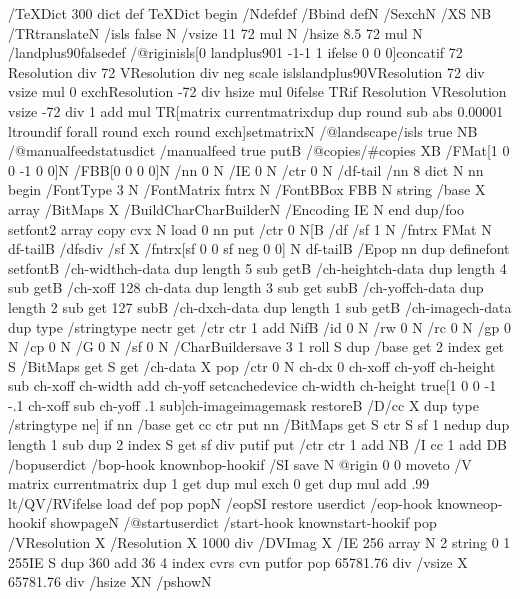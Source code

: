 /TeXDict 300 dict def TeXDict begin /N{def}def /B{bind def}N /S{exch}N
/X{S N}B /TR{translate}N /isls false N /vsize 11 72 mul N /hsize 8.5 72
mul N /landplus90{false}def /@rigin{isls{[0 landplus90{1 -1}{-1 1}
ifelse 0 0 0]concat}if 72 Resolution div 72 VResolution div neg scale
isls{landplus90{VResolution 72 div vsize mul 0 exch}{Resolution -72 div
hsize mul 0}ifelse TR}if Resolution VResolution vsize -72 div 1 add mul
TR[matrix currentmatrix{dup dup round sub abs 0.00001 lt{round}if}
forall round exch round exch]setmatrix}N /@landscape{/isls true N}B
/@manualfeed{statusdict /manualfeed true put}B /@copies{/#copies X}B
/FMat[1 0 0 -1 0 0]N /FBB[0 0 0 0]N /nn 0 N /IE 0 N /ctr 0 N /df-tail{
/nn 8 dict N nn begin /FontType 3 N /FontMatrix fntrx N /FontBBox FBB N
string /base X array /BitMaps X /BuildChar{CharBuilder}N /Encoding IE N
end dup{/foo setfont}2 array copy cvx N load 0 nn put /ctr 0 N[}B /df{
/sf 1 N /fntrx FMat N df-tail}B /dfs{div /sf X /fntrx[sf 0 0 sf neg 0 0]
N df-tail}B /E{pop nn dup definefont setfont}B /ch-width{ch-data dup
length 5 sub get}B /ch-height{ch-data dup length 4 sub get}B /ch-xoff{
128 ch-data dup length 3 sub get sub}B /ch-yoff{ch-data dup length 2 sub
get 127 sub}B /ch-dx{ch-data dup length 1 sub get}B /ch-image{ch-data
dup type /stringtype ne{ctr get /ctr ctr 1 add N}if}B /id 0 N /rw 0 N
/rc 0 N /gp 0 N /cp 0 N /G 0 N /sf 0 N /CharBuilder{save 3 1 roll S dup
/base get 2 index get S /BitMaps get S get /ch-data X pop /ctr 0 N ch-dx
0 ch-xoff ch-yoff ch-height sub ch-xoff ch-width add ch-yoff
setcachedevice ch-width ch-height true[1 0 0 -1 -.1 ch-xoff sub ch-yoff
.1 sub]{ch-image}imagemask restore}B /D{/cc X dup type /stringtype ne{]}
if nn /base get cc ctr put nn /BitMaps get S ctr S sf 1 ne{dup dup
length 1 sub dup 2 index S get sf div put}if put /ctr ctr 1 add N}B /I{
cc 1 add D}B /bop{userdict /bop-hook known{bop-hook}if /SI save N @rigin
0 0 moveto /V matrix currentmatrix dup 1 get dup mul exch 0 get dup mul
add .99 lt{/QV}{/RV}ifelse load def pop pop}N /eop{SI restore userdict
/eop-hook known{eop-hook}if showpage}N /@start{userdict /start-hook
known{start-hook}if pop /VResolution X /Resolution X 1000 div /DVImag X
/IE 256 array N 2 string 0 1 255{IE S dup 360 add 36 4 index cvrs cvn
put}for pop 65781.76 div /vsize X 65781.76 div /hsize X}N /p{show}N
